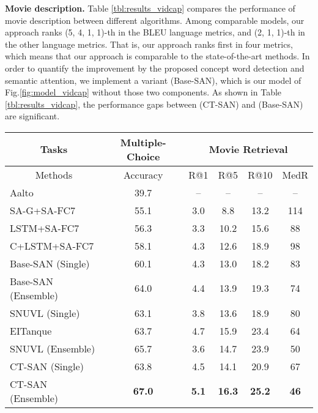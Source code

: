 \documentclass[10pt,twocolumn,letterpaper]{article}
\theoremstyle{nonumberplain}
\begin{document}
\textbf{Movie description.}
Table \ref{tbl:results_vidcap} compares the performance of movie description between different algorithms.
Among comparable models, our approach ranks (5, 4, 1, 1)-th in the BLEU language metrics,
and (2, 1, 1)-th in the other language metrics.
That is, our approach ranks first in four metrics, which means that our approach is comparable to the state-of-the-art methods.
In order to quantify the improvement by the proposed concept word detection and semantic attention,
we implement a variant (Base-SAN), which is our model of Fig.\ref{fig:model_vidcap}  without those two components.
As shown in Table \ref{tbl:results_vidcap}, the performance gaps between (CT-SAN) and (Base-SAN) are significant.

\begin{table}[t!]
\centering
\small
\newcommand{\ranked}[1]{}
\setlength\tabcolsep{1.5pt}
\begin{tabular}{|l|c|cccc|}
\hline
\multicolumn{1}{|c|}{Tasks }           & {\footnotesize Multiple-Choice} & \multicolumn{4}{c|}{\footnotesize Movie Retrieval} \\ \hline
\multicolumn{1}{|c|}{Methods}          & {Accuracy}                      & {\footnotesize R@1}                                 & {\footnotesize R@5 } & {\footnotesize R@10 } & {\footnotesize MedR } \\ \hline
Aalto                                  & 39.7          & --           & --            & --            & --          \\
SA-G+SA-FC7 \cite{torabi-arxiv-2016}   & 55.1          & 3.0          & 8.8           & 13.2          & 114         \\
LSTM+SA-FC7 \cite{torabi-arxiv-2016}   & 56.3          & 3.3          & 10.2          & 15.6          & 88          \\
C+LSTM+SA-FC7 \cite{torabi-arxiv-2016} & 58.1          & 4.3          & 12.6          & 18.9          & 98          \\
Base-SAN (Single)                      & 60.1          & 4.3          & 13.0          & 18.2          & 83          \\ Base-SAN (Ensemble)                    & 64.0          & 4.4          & 13.9          & 19.3          & 74     \\ SNUVL (Single)                         & 63.1          & 3.8          & 13.6          & 18.9          & 80          \\ EITanque \cite{kaufman-arxiv-2016}     & 63.7          & 4.7          & 15.9          & 23.4          & 64          \\
SNUVL (Ensemble)                       & 65.7          & 3.6          & 14.7          & 23.9          & 50          \\ \hline
CT-SAN (Single)                        & 63.8          & 4.5          & 14.1          & 20.9          & 67          \\ CT-SAN (Ensemble)                      & \textbf{67.0} & \textbf{5.1} & \textbf{16.3} & \textbf{25.2} & \textbf{46} \\ \hline
\end{tabular}


\end{table}
\end{document}
